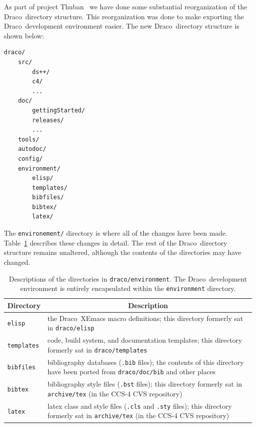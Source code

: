 \documentclass[note]{ResearchNote_pdf}
\newcommand{\draco}{Draco}
\newcommand{\tableText}[1]{{\raggedright #1}}
\begin{document}
As part of project Thuban~\cite{ccs-4:04-21} we have done some
substantial reorganization of the \draco\ directory structure.  This
reorganization was done to make exporting the \draco\ development
environment easier.  The new \draco\ directory structure is shown below: 
\begin{lstlisting}[basicstyle=\footnotesize, xleftmargin=2.0in, 
  xrightmargin=2.0in]
draco/
    src/
        ds++/
        c4/
        ...
    doc/
        gettingStarted/
        releases/
        ...
    tools/
    autodoc/
    config/
    environment/
        elisp/
        templates/
        bibfiles/
        bibtex/
        latex/
\end{lstlisting}
The \texttt{environement/} directory is where all of the changes have
been made.  Table~\ref{tab:envdir} describes these changes in detail.
The rest of the \draco\ directory structure remains unaltered,
although the contents of the directories may have changed.
\begin{table}
  \caption{
    Descriptions of the directories in \texttt{draco/environment}.
    The \draco\ development environment is entirely encapsulated
    within the \texttt{environment} directory.
  }
  \label{tab:envdir}
  \begin{center}
    \begin{tabular}{lp{3in}}\hline\hline
      \multicolumn{1}{c}{Directory} & 
      \multicolumn{1}{c}{Description} \\ \hline
      
      \texttt{elisp} & \tableText{the \draco\ XEmacs macro
        definitions; this directory formerly sat in
        \texttt{draco/elisp}} \\ 
      
      \texttt{templates} & \tableText{code, build system, and
        documentation templates; this directory formerly sat in
        \texttt{draco/templates}} \\

      \texttt{bibfiles} & \tableText{bibliography databases
        (\texttt{.bib} files); the contents of this directory have
        been ported from \texttt{draco/doc/bib} and other places} \\ 
      
      \texttt{bibtex} & \tableText{bibliography style files
        (\texttt{.bst} files); this directory formerly sat in
        \texttt{archive/tex} (in the CCS-4 CVS repository)} \\
      
      \texttt{latex} & \tableText{latex class and style files
        (\texttt{.cls} and \texttt{.sty} files); this directory
        formerly sat in \texttt{archive/tex} (in the CCS-4 CVS
        repository)} \\ 

      \hline\hline
    \end{tabular}
  \end{center}
\end{table}
\end{document}
